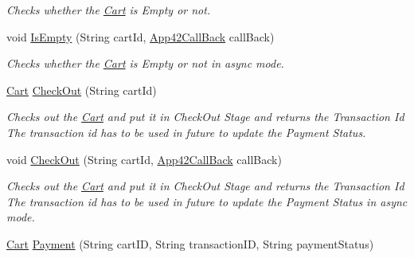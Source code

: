 \begin{DoxyCompactItemize}
\begin{DoxyCompactList}\small\item\em Checks whether the \hyperlink{classcom_1_1shephertz_1_1app42_1_1paas_1_1sdk_1_1csharp_1_1shopping_1_1_cart}{Cart} is Empty or not. \end{DoxyCompactList}\item 
void \hyperlink{classcom_1_1shephertz_1_1app42_1_1paas_1_1sdk_1_1csharp_1_1shopping_1_1_cart_service_af79c37e77ea000178a81f4936030a5f7}{Is\+Empty} (String cart\+Id, \hyperlink{interfacecom_1_1shephertz_1_1app42_1_1paas_1_1sdk_1_1csharp_1_1_app42_call_back}{App42\+Call\+Back} call\+Back)
\begin{DoxyCompactList}\small\item\em Checks whether the \hyperlink{classcom_1_1shephertz_1_1app42_1_1paas_1_1sdk_1_1csharp_1_1shopping_1_1_cart}{Cart} is Empty or not in async mode. \end{DoxyCompactList}\item 
\hyperlink{classcom_1_1shephertz_1_1app42_1_1paas_1_1sdk_1_1csharp_1_1shopping_1_1_cart}{Cart} \hyperlink{classcom_1_1shephertz_1_1app42_1_1paas_1_1sdk_1_1csharp_1_1shopping_1_1_cart_service_aba0ca7b216f6e4e84e8777d38e826eeb}{Check\+Out} (String cart\+Id)
\begin{DoxyCompactList}\small\item\em Checks out the \hyperlink{classcom_1_1shephertz_1_1app42_1_1paas_1_1sdk_1_1csharp_1_1shopping_1_1_cart}{Cart} and put it in Check\+Out Stage and returns the Transaction Id The transaction id has to be used in future to update the Payment Status. \end{DoxyCompactList}\item 
void \hyperlink{classcom_1_1shephertz_1_1app42_1_1paas_1_1sdk_1_1csharp_1_1shopping_1_1_cart_service_adf8f4974e997dfd54f6d8a72b4fa54e7}{Check\+Out} (String cart\+Id, \hyperlink{interfacecom_1_1shephertz_1_1app42_1_1paas_1_1sdk_1_1csharp_1_1_app42_call_back}{App42\+Call\+Back} call\+Back)
\begin{DoxyCompactList}\small\item\em Checks out the \hyperlink{classcom_1_1shephertz_1_1app42_1_1paas_1_1sdk_1_1csharp_1_1shopping_1_1_cart}{Cart} and put it in Check\+Out Stage and returns the Transaction Id The transaction id has to be used in future to update the Payment Status in async mode. \end{DoxyCompactList}\item 
\hyperlink{classcom_1_1shephertz_1_1app42_1_1paas_1_1sdk_1_1csharp_1_1shopping_1_1_cart}{Cart} \hyperlink{classcom_1_1shephertz_1_1app42_1_1paas_1_1sdk_1_1csharp_1_1shopping_1_1_cart_service_a544e1d2c3b4fa08ebc961c6be3499e1b}{Payment} (String cart\+I\+D, String transaction\+I\+D, String payment\+Status)

\end{DoxyCompactItemize}
